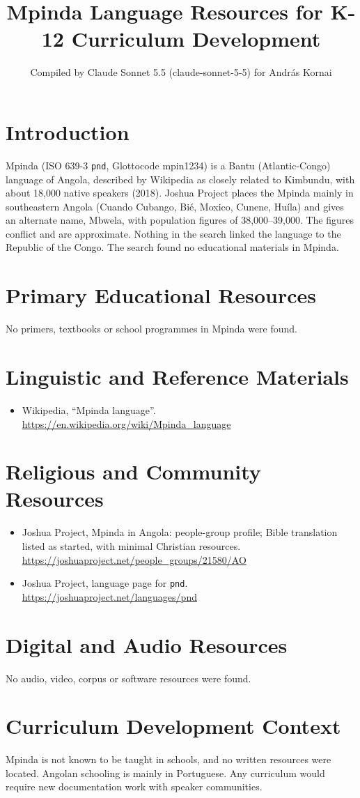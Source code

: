 \documentclass[12pt]{article}
\title{Mpinda Language Resources for K-12 Curriculum Development}
\author{Compiled by Claude Sonnet 5.5 (claude-sonnet-5-5) for Andr\'as Kornai}
\date{}
\begin{document}
\maketitle

\section{Introduction}
Mpinda (ISO 639-3 \texttt{pnd}, Glottocode mpin1234) is a Bantu (Atlantic-Congo) language of Angola, described by Wikipedia as closely related to Kimbundu, with about 18,000 native speakers (2018). Joshua Project places the Mpinda mainly in southeastern Angola (Cuando Cubango, Bi\'e, Moxico, Cunene, Hu\'ila) and gives an alternate name, Mbwela, with population figures of 38,000--39,000. The figures conflict and are approximate. Nothing in the search linked the language to the Republic of the Congo. The search found no educational materials in Mpinda.

\section{Primary Educational Resources}
No primers, textbooks or school programmes in Mpinda were found.

\section{Linguistic and Reference Materials}
\begin{itemize}
\item Wikipedia, ``Mpinda language''. \url{https://en.wikipedia.org/wiki/Mpinda_language}
\end{itemize}

\section{Religious and Community Resources}
\begin{itemize}
\item Joshua Project, Mpinda in Angola: people-group profile; Bible translation listed as started, with minimal Christian resources. \url{https://joshuaproject.net/people_groups/21580/AO}
\item Joshua Project, language page for \texttt{pnd}. \url{https://joshuaproject.net/languages/pnd}
\end{itemize}

\section{Digital and Audio Resources}
No audio, video, corpus or software resources were found.

\section{Curriculum Development Context}
Mpinda is not known to be taught in schools, and no written resources were located. Angolan schooling is mainly in Portuguese. Any curriculum would require new documentation work with speaker communities.
\end{document}
